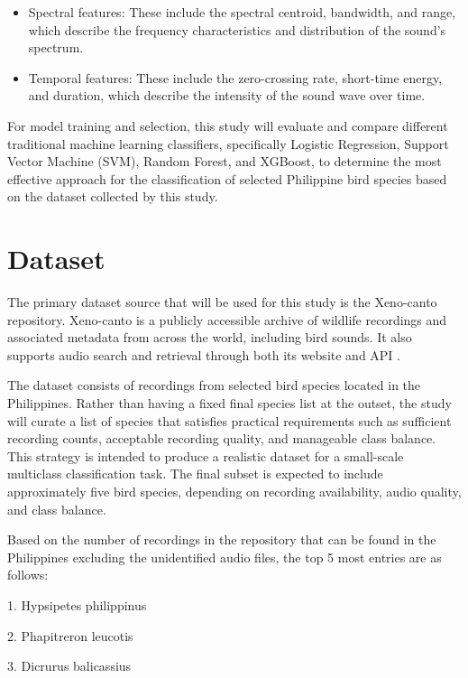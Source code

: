 \documentclass[runningheads]{llncs}
\begin{document}
{
\renewcommand{\labelitemi}{\small$\bullet$}
\begin{itemize}
  \item Spectral features: These include the spectral centroid, bandwidth, and range, which describe the frequency characteristics and distribution of the sound’s spectrum.
  \item Temporal features: These include the zero-crossing rate, short-time energy, and duration, which describe the intensity of the sound wave over time.
\end{itemize}
}

For model training and selection, this study will evaluate and compare different traditional machine learning classifiers, specifically Logistic Regression, Support Vector Machine (SVM), Random Forest, and XGBoost, to determine the most effective approach for the classification of selected Philippine bird species based on the dataset collected by this study.

\section{Dataset}

The primary dataset source that will be used for this study is the Xeno-canto repository. Xeno-canto is a publicly accessible archive of wildlife recordings and associated metadata from across the world, including bird sounds. It also supports audio search and retrieval through both its website and API \cite{xenocanto}.

The dataset consists of recordings from selected bird species located in the Philippines. Rather than having a fixed final species list at the outset, the study will curate a list of species that satisfies practical requirements such as sufficient recording counts, acceptable recording quality, and manageable class balance. This strategy is intended to produce a realistic dataset for a small-scale multiclass classification task. The final subset is expected to include approximately five bird species, depending on recording availability, audio quality, and class balance.

Based on the number of recordings in the repository that can be found in the Philippines excluding the unidentified audio files, the top 5 most entries are as follows: 

1. Hypsipetes philippinus

2. Phapitreron leucotis 

3. Dicrurus balicassius 
\end{document}
